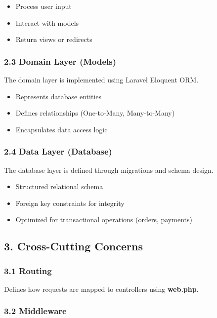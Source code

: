 \documentclass[12pt,a4paper]{article}
\begin{document}
\begin{itemize}[noitemsep]
    \item Process user input
    \item Interact with models
    \item Return views or redirects
\end{itemize}

\subsubsection{2.3 Domain Layer (Models)}

The domain layer is implemented using Laravel Eloquent ORM.

\begin{itemize}[noitemsep]
    \item Represents database entities
    \item Defines relationships (One-to-Many, Many-to-Many)
    \item Encapsulates data access logic
\end{itemize}

\subsubsection{2.4 Data Layer (Database)}

The database layer is defined through migrations and schema design.

\begin{itemize}[noitemsep]
    \item Structured relational schema
    \item Foreign key constraints for integrity
    \item Optimized for transactional operations (orders, payments)
\end{itemize}

\subsection{3. Cross-Cutting Concerns}

\subsubsection{3.1 Routing}

Defines how requests are mapped to controllers using \textbf{web.php}.

\subsubsection{3.2 Middleware}
\end{document}
